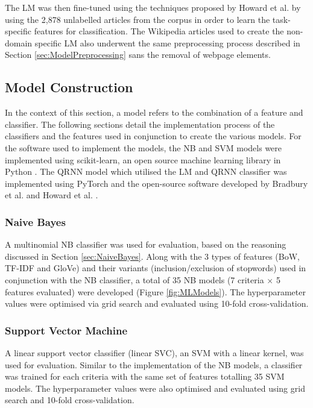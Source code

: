\documentclass[a4paper,twoside,phd]{BYUPhys}
\begin{document}
The LM was then fine-tuned using the techniques proposed by Howard et al. \cite{Howard2018} by using the 2,878 unlabelled articles from the corpus in order to learn the task-specific features for classification. The Wikipedia articles used to create the non-domain specific LM also underwent the same preprocessing process described in Section \ref{sec:ModelPreprocessing} sans the removal of webpage elements. 

\subsection{Model Construction}
\label{sec:ModelSelection}

In the context of this section, a model refers to the combination of a feature and classifier. The following sections detail the implementation process of the classifiers and the features used in conjunction to create the various models.
For the software used to implement the models, the NB and SVM models were implemented using scikit-learn, an open source machine learning library in Python \cite{scikit-learn}. The QRNN model which utilised the LM and QRNN classifier was implemented using PyTorch \cite{paszke2017automatic} and the open-source software developed by Bradbury et al. \cite{bradbury2016quasi} and Howard et al. \cite{Howard2018}. 

\subsubsection{Naive Bayes}
\label{sec:ModelNB}

A multinomial NB classifier was used for evaluation, based on the reasoning discussed in Section \ref{sec:NaiveBayes}. Along with the 3 types of features (BoW, TF-IDF and GloVe) and their variants (inclusion/exclusion of stopwords) used in conjunction with the NB classifier, a total of 35 NB models (7 criteria $\times$ 5 features evaluated) were developed (Figure \ref{fig:MLModels}). The hyperparameter values were optimised via grid search and evaluated using 10-fold cross-validation. 

\subsubsection{Support Vector Machine}
\label{sec:ModelSVM}

A linear support vector classifier (linear SVC), an SVM with a linear kernel, was used for evaluation. Similar to the implementation of the NB models, a classifier was trained for each criteria with the same set of features totalling 35 SVM models. The hyperparameter values were also optimised and evaluated using grid search and 10-fold cross-validation.
\end{document}

